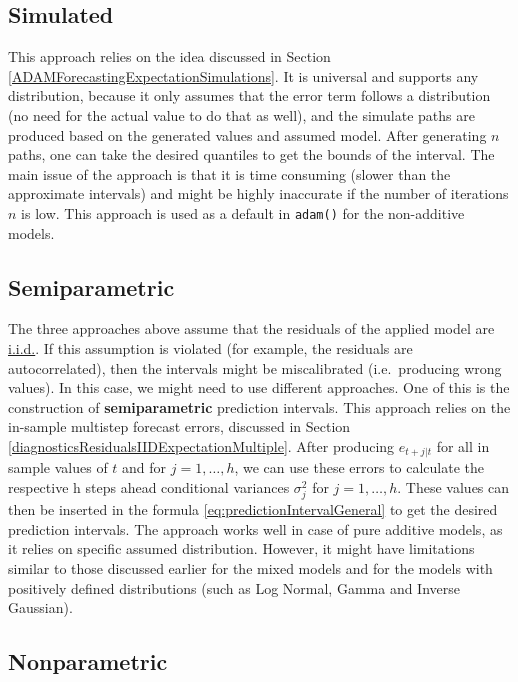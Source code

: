 \documentclass[
]{book}
\theoremstyle{definition}
\theoremstyle{definition}
\theoremstyle{definition}
\theoremstyle{definition}
\theoremstyle{remark}
\begin{document}
\hypertarget{ADAMForecastingPISimulations}{%
\subsection{Simulated}\label{ADAMForecastingPISimulations}}

This approach relies on the idea discussed in Section \ref{ADAMForecastingExpectationSimulations}. It is universal and supports any distribution, because it only assumes that the error term follows a distribution (no need for the actual value to do that as well), and the simulate paths are produced based on the generated values and assumed model. After generating \(n\) paths, one can take the desired quantiles to get the bounds of the interval. The main issue of the approach is that it is time consuming (slower than the approximate intervals) and might be highly inaccurate if the number of iterations \(n\) is low. This approach is used as a default in \texttt{adam()} for the non-additive models.

\hypertarget{semiparametric}{%
\subsection{Semiparametric}\label{semiparametric}}

The three approaches above assume that the residuals of the applied model are \protect\hyperlink{diagnostics}{i.i.d.}. If this assumption is violated (for example, the residuals are autocorrelated), then the intervals might be miscalibrated (i.e.~producing wrong values). In this case, we might need to use different approaches. One of this is the construction of \textbf{semiparametric} prediction intervals. This approach relies on the in-sample multistep forecast errors, discussed in Section \ref{diagnosticsResidualsIIDExpectationMultiple}. After producing \(e_{t+j|t}\) for all in sample values of \(t\) and for \(j=1,\dots,h\), we can use these errors to calculate the respective h steps ahead conditional variances \(\sigma_j^2\) for \(j=1,\dots,h\). These values can then be inserted in the formula \eqref{eq:predictionIntervalGeneral} to get the desired prediction intervals. The approach works well in case of pure additive models, as it relies on specific assumed distribution. However, it might have limitations similar to those discussed earlier for the mixed models and for the models with positively defined distributions (such as Log Normal, Gamma and Inverse Gaussian).

\hypertarget{nonparametric}{%
\subsection{Nonparametric}\label{nonparametric}}
\end{document}
